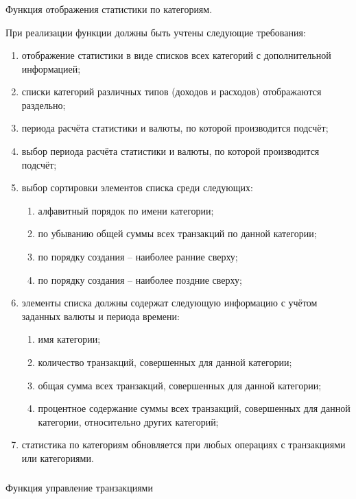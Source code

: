 \subsubsection{} Функция отображения статистики по категориям.
\label{sec:domain:specification:categories_stats}

При реализации функции должны быть учтены следующие требования:

\begin{enumerate}
    \item отображение статистики в виде списков всех категорий с дополнительной информацией;
    \item списки категорий различных типов (доходов и расходов) отображаются раздельно;
    \item периода расчёта статистики и валюты, по которой производится подсчёт;
    \item выбор периода расчёта статистики и валюты, по которой производится подсчёт;
    \item выбор сортировки элементов списка среди следующих:
    \begin{enumerate}
        \item алфавитный порядок по имени категории;
        \item по убыванию общей суммы всех транзакций по данной категории;
        \item по порядку создания -- наиболее ранние сверху;
        \item по порядку создания -- наиболее поздние сверху;
    \end{enumerate}
    \item элементы списка должны содержат следующую информацию с учётом заданных валюты и периода времени:
    \begin{enumerate}
        \item имя категории;
        \item количество транзакций, совершенных для данной категории;
        \item общая сумма всех транзакций, совершенных для данной категории;
        \item процентное содержание суммы всех транзакций, совершенных для данной категории, относительно других категорий;
    \end{enumerate}
    \item статистика по категориям обновляется при любых операциях с транзакциями или категориями.
\end{enumerate}

\subsubsection{} Функция управление транзакциями
\label{sec:domain:specification:transactions}


